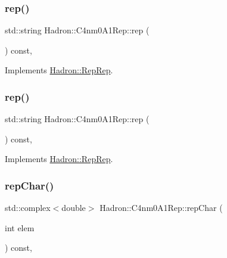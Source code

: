 \subsubsection{\texorpdfstring{rep()}{rep()}\hspace{0.1cm}{\footnotesize\ttfamily [2/3]}}
{\footnotesize\ttfamily std\+::string Hadron\+::\+C4nm0\+A1\+Rep\+::rep (\begin{DoxyParamCaption}{ }\end{DoxyParamCaption}) const\hspace{0.3cm}{\ttfamily [inline]}, {\ttfamily [virtual]}}



Implements \mbox{\hyperlink{structHadron_1_1RepRep_ab3213025f6de249f7095892109575fde}{Hadron\+::\+Rep\+Rep}}.

\mbox{\label{structHadron_1_1C4nm0A1Rep_a5abe060187192307a0f68c3ac73704bc}} 
\subsubsection{\texorpdfstring{rep()}{rep()}\hspace{0.1cm}{\footnotesize\ttfamily [3/3]}}
{\footnotesize\ttfamily std\+::string Hadron\+::\+C4nm0\+A1\+Rep\+::rep (\begin{DoxyParamCaption}{ }\end{DoxyParamCaption}) const\hspace{0.3cm}{\ttfamily [inline]}, {\ttfamily [virtual]}}



Implements \mbox{\hyperlink{structHadron_1_1RepRep_ab3213025f6de249f7095892109575fde}{Hadron\+::\+Rep\+Rep}}.

\mbox{\label{structHadron_1_1C4nm0A1Rep_ac54e244df5f9d7618d3033c48a7fb020}} 
\subsubsection{\texorpdfstring{repChar()}{repChar()}\hspace{0.1cm}{\footnotesize\ttfamily [1/2]}}
{\footnotesize\ttfamily std\+::complex$<$double$>$ Hadron\+::\+C4nm0\+A1\+Rep\+::rep\+Char (\begin{DoxyParamCaption}\item[{int}]{elem }\end{DoxyParamCaption}) const\hspace{0.3cm}{\ttfamily [inline]}, {\ttfamily [virtual]}}



